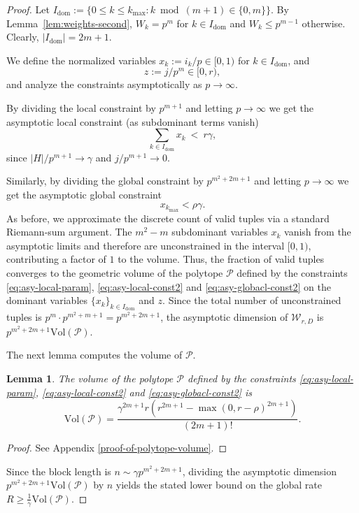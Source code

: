 \documentclass[11pt]{article}
\theoremstyle{plain}
\newtheorem{lemma}[theorem]{Lemma}
\theoremstyle{definition}
\begin{document}
\begin{proof}
Let $I_{\mathrm{dom}}:=\{0\le k\le k_{\max}: k\bmod(m+1)\in\{0,m\}\}$.
By Lemma~\ref{lem:weights-second}, $W_k=p^m$ for $k\in I_{\mathrm{dom}}$ and $W_k\le p^{m-1}$ otherwise.
Clearly,  $|I_{\mathrm{dom}}|=2m+1$.

We define the normalized variables $x_k := i_k/p \in [0,1)$ for $k\in I_{\mathrm{dom}}$, and \begin{equation}
    \label{eq:asy-local-param}
z := j/p^m \in[0,r),
\end{equation} and analyze the constraints asymptotically as $p\to\infty$.

By dividing the  local constraint by $p^{m+1}$ and letting  $p\to\infty$ we get the asymptotic local constraint (as  subdominant terms vanish)
\begin{equation}
\label{eq:asy-local-const2}    
\sum_{k\in I_{\mathrm{dom}}} x_k \ <\ r\gamma,
\end{equation}
since $ |H|/p^{m+1}\to\gamma$ and $j/p^{m+1}\to 0$.


Similarly, by dividing the global  constraint by $p^{m^2+2m+1}$ and letting $p\to\infty$ we get the  asymptotic global constraint
\begin{equation}
\label{eq:asy-globacl-const2}
x_{k_{\max}} < \rho\gamma.
\end{equation}
As before, we approximate the discrete count of valid tuples via a standard Riemann-sum argument.
The $m^2-m$ subdominant variables $x_k$ vanish from the asymptotic limits and therefore are unconstrained in the interval $[0,1)$, contributing a factor of $1$ to the volume. Thus, the fraction of valid tuples converges to the geometric volume of the polytope $\mathcal{P}$ defined by the constraints \eqref{eq:asy-local-param}, \eqref{eq:asy-local-const2} and \eqref{eq:asy-globacl-const2} on the dominant variables $\{x_k\}_{k\in I_{\mathrm{dom}}}$ and $z$.
Since the total number of unconstrained tuples is $p^m \cdot p^{m^2+m+1} = p^{m^2+2m+1}$, the asymptotic dimension of $\mathcal{W}_{r,D}$ is $p^{m^2+2m+1}\mathrm{Vol}(\mathcal{P})$.

The next lemma computes the  volume of $\mathcal{P}$.
\begin{lemma}
\label{lem:polytope_volume2}
The volume of the polytope $\mathcal{P}$ defined by the constraints \eqref{eq:asy-local-param}, \eqref{eq:asy-local-const2} and \eqref{eq:asy-globacl-const2} is
\[
\mathrm{Vol}(\mathcal{P}) = \frac{\gamma^{2m+1}r\left(r^{2m+1}-\max(0,r-\rho)^{2m+1}\right)}{(2m+1)!}.
\]
\end{lemma}

\begin{proof}
    See Appendix \ref{proof-of-polytope-volume}.
\end{proof}

Since the block length is $n\sim \gamma p^{m^2+2m+1}$, dividing the asymptotic dimension $p^{m^2+2m+1}\mathrm{Vol}(\mathcal{P})$ by $n$ yields the stated lower bound on the global rate $R \ge \frac{1}{\gamma}\mathrm{Vol}(\mathcal{P})$.
\end{proof}
\end{document}
